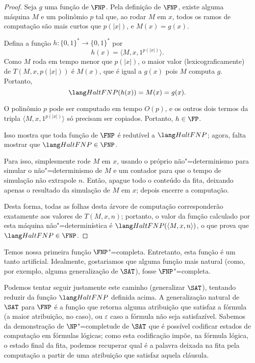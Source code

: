 \begin{proof}
    Seja $g$ uma função de $\FNP$.
    Pela definição de $\FNP$, existe alguma máquina $M$
    e um polinômio $p$ tal que,
    ao rodar $M$ em $x$,
    todos os ramos de computação são mais curtos que $p(|x|)$,
    e $M(x) = g(x)$.

    Defina a função $h: \{0, 1\}^* \to \{0, 1\}^*$
    por
    \begin{equation*}
        h(x) = \langle M, x, 1^{p(|x|)} \rangle.
    \end{equation*}
    Como $M$ roda em tempo menor que $p(|x|)$,
    o maior valor (lexicograficamente) de $T(M, x, p(|x|))$ é $M(x)$,
    que é igual a $g(x)$ pois $M$ computa $g$.
    Portanto,
    \begin{equation*}
        \HaltFNP(h(x)) = M(x) = g(x).
    \end{equation*}

    O polinômio $p$ pode ser computado em tempo $O(p)$,
    e os outros dois termos da tripla $\langle M, x, 1^{p(|x|)} \rangle$
    só precisam ser copiados. Portanto, $h \in \FP$.

    Isso mostra que toda função de $\FNP$ é redutível a $\HaltFNP$;
    agora, falta mostrar que $\HaltFNP \in \FNP$.

    Para isso, simplesmente rode $M$ em $x$,
    usando o próprio não"=determinismo para simular o não"=determinismo de $M$
    e um contador para que o tempo de simulação não extrapole $n$.
    Então, apague todo o conteúdo da fita,
    deixando apenas o resultado da simulação de $M$ em $x$;
    depois encerre a computação.

    Desta forma, todas as folhas desta árvore de computação
    corresponderão exatamente aos valores de $T(M, x, n)$;
    portanto, o valor da função calculado por esta máquina não"=determinística
    é $\HaltFNP(\langle M, x, n \rangle)$,
    o que prova que $\HaltFNP \in \FNP$.
\end{proof}

Temos nossa primeira função $\FNP$"=completa.
Entretanto, esta função é um tanto artificial.
Idealmente, gostariamos que alguma função mais natural
(como, por exemplo, alguma generalização de $\SAT$),
fosse $\FNP$"=completa.

Podemos tentar seguir justamente este caminho
(generalizar $\SAT$),
tentando reduzir da função $\HaltFNP$ definida acima.
A generalização natural de $\SAT$ para $\FNP$
é a função que retorna alguma atribuição que satisfaz a fórmula
(a maior atribuição, no caso),
ou $\varepsilon$ caso a fórmula não seja satisfazível.
Sabemos da demonstração de $\NP$"=completude de $\SAT$
que é possível codificar estados de computação em fórmulas lógicas;
como esta codificação impõe,
na fórmula lógica,
o estado final da fita,
podemos recuperar qual é a palavra deixada na fita pela computação
a partir de uma atribuição que satisfaz aquela cláusula.

